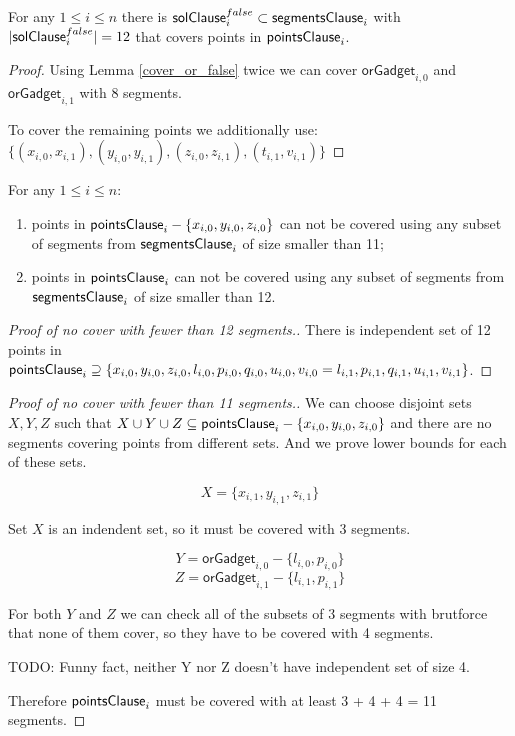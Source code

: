 \begin{lemma}
\label{cover_clauses_solution_false}
For any $1 \le i \le n$ there is
$\mathsf{solClause}^{false}_i \subset \mathsf{segmentsClause}_i$
with $|\mathsf{solClause}^{false}_i| = 12$
that covers points in $\mathsf{pointsClause}_i$.
\end{lemma}

\begin{proof}
Using Lemma \ref{cover_or_false} twice we can
cover $\mathsf{orGadget}_{i,0}$ and  $\mathsf{orGadget}_{i,1}$
with 8 segments.

To cover the remaining points we additionally use:
$\{ (x_{i, 0}, x_{i, 1}), (y_{i, 0}, y_{i, 1}),
(z_{i, 0}, z_{i, 1}), (t_{i, 1}, v_{i, 1}) \}$
\end{proof}

\begin{lemma}
\label{cover_clauses_segments_no_less}
For any $1 \le i \le n$:
\begin{enumerate}[label={(\arabic*)}]
	\item points in $\mathsf{pointsClause}_i - \{ x_{i, 0}, y_{i, 0}, z_{i, 0}\}$
	can not be covered using any subset of segments
	from $\mathsf{segmentsClause}_i$ of size smaller than 11;
	\item points in $\mathsf{pointsClause}_i$ can not be covered 
	using any subset of segments
	from $\mathsf{segmentsClause}_i$ of size smaller than 12.
\end{enumerate}
\end{lemma}


\begin{proof}[Proof of no cover with fewer than 12 segments.]
There is independent set of 12 points in $\mathsf{pointsClause}_i \supseteq
\{ x_{i, 0}, y_{i, 0}, z_{i, 0}, l_{i, 0}, p_{i, 0}, q_{i, 0},
u_{i, 0}, v_{i, 0} = l_{i, 1}, p_{i, 1}, q_{i, 1}, u_{i, 1}, v_{i, 1} \}$.
\end{proof}

\begin{proof}[Proof of no cover with fewer than 11 segments.]

We can choose disjoint sets $X, Y, Z$ such that
$X \cup Y \cup Z \subseteq \mathsf{pointsClause}_i - \{x_{i, 0}, y_{i, 0}, z_{i, 0}\}$
and there are no segments covering points from different sets.
And we prove lower bounds for each of these sets.

$$X = \{x_{i, 1}, y_{i, 1}, z_{i, 1}\}$$

Set $X$ is an indendent set, so it must be covered with 3 segments.

$$Y = \mathsf{orGadget}_{i, 0} - \{l_{i, 0}, p_{i, 0}\}$$
$$Z = \mathsf{orGadget}_{i, 1} - \{l_{i, 1}, p_{i, 1}\}$$


For both $Y$ and $Z$ we can check all of the subsets of 3 segments
with brutforce that none of them cover, so they have to be covered with
4 segments.

TODO: Funny fact, neither Y nor Z doesn't have independent set of size 4.

Therefore $\mathsf{pointsClause}_i$ must be covered with at least 3 + 4 + 4 = 11 segments.
\end{proof}

